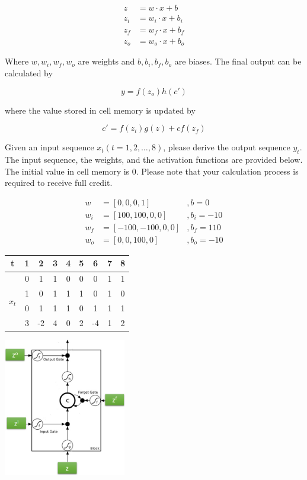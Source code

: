 \documentclass{article}
\begin{document}
\begin{equation*}
\begin{aligned}
  z &= w \cdot x + b\\
z_i &= w_i \cdot x + b_i\\
z_f &= w_f \cdot x + b_f\\
z_o &= w_o \cdot x + b_o
\end{aligned}
\end{equation*}

Where $w, w_i, w_f, w_o$ are weights and $b, b_i, b_f, b_o$ are biases. The final output can be calculated by

\begin{equation*}
y = f(z_o)h(c')
\end{equation*}

where the value stored in cell memory is updated by

\begin{equation*}
c' =f(z_i)g(z)+c f(z_f)
\end{equation*}

Given an input sequence $x_t (t = 1, 2, \ldots, 8)$, please derive the output sequence $y_t$. The input sequence, the weights, and the activation functions are provided below. The initial value in cell memory is 0. Please note that your calculation process is required to receive full credit.

\begin{multicols}{2}
\begin{equation*}
\begin{aligned}
w   &= [0, 0, 0, 1] &, b = 0\\
w_i &= [100, 100, 0, 0] &, b_i = -10\\
w_f &= [-100, -100, 0, 0] &, b_f = 110\\
w_o &= [0, 0, 100, 0] &, b_o = -10 
\end{aligned}
\end{equation*}

\begin{tabular}{c|cccccccc}
t & 1 & 2 & 3 & 4 & 5 & 6 & 7 & 8\\
\hline
\multirow{4}{*}{$x_t$} & 0 & 1 & 1 & 0 & 0 & 0 & 1 & 1\\
& 1 & 0 & 1 & 1 & 1 & 0 & 1 & 0\\
& 0 & 1 & 1 & 1 & 0 & 1 & 1 & 1\\
& 3 & -2 & 4 & 0 & 2 & -4 & 1 & 2
\end{tabular}

\includegraphics[width=0.4\textwidth]{image-002.jpg}

\end{multicols}
\end{document}
